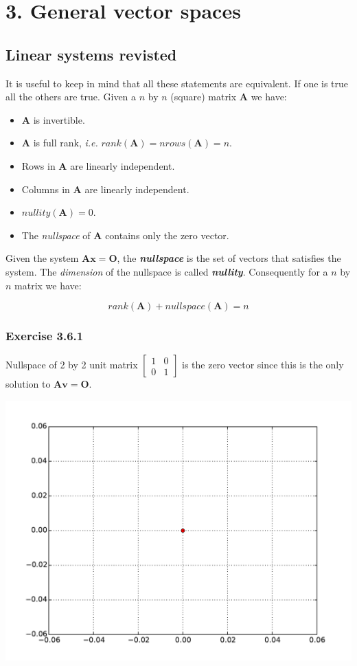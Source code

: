 \section{3. General vector spaces}

\subsection{Linear systems revisted}

It is useful to keep in mind that all these statements are equivalent. If one is
true all the others are true. Given a $n$ by $n$ (square) matrix \textbf{A} we have:

\begin{itemize}
\item \textbf{A} is invertible.
\item \textbf{A} is full rank, \emph{i.e.} $rank(\mathbf{A}) = nrows(\mathbf{A}) = n$.
\item Rows in \textbf{A} are linearly independent.
\item Columns in \textbf{A} are linearly independent.
\item $nullity(\mathbf{A}) = 0$.
\item The \emph{nullspace} of \textbf{A} contains only the zero vector.
\end{itemize}

Given the system $\mathbf{Ax = O}$, the \textbf{\emph{nullspace}} is the set of
vectors that satisfies the system. The \emph{dimension} of the nullspace is called
\textbf{\emph{nullity}}. Consequently for a $n$ by $n$ matrix we have:

$$
rank(\mathbf{A}) + nullspace(\mathbf{A}) = n
$$

\subsubsection{Exercise 3.6.1}

Nullspace of 2 by 2 unit matrix $\left[\begin{matrix}1 & 0\\0 & 1\end{matrix}\right]$
is the zero vector since this is the only solution to $\mathbf{Av = O}$.

\includegraphics[width=0.7\linewidth]{figs/ex3_6_1.pdf}

